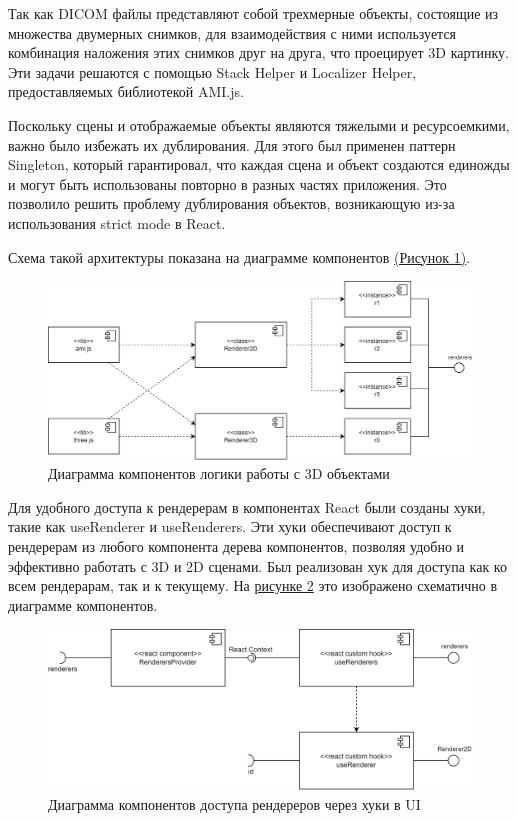 Так как DICOM файлы представляют собой трехмерные объекты, состоящие из множества двумерных снимков, для взаимодействия с ними используется комбинация наложения этих снимков друг на друга, что проецирует 3D картинку. Эти задачи решаются с помощью Stack Helper и Localizer Helper, предоставляемых библиотекой AMI.js.

Поскольку сцены и отображаемые объекты являются тяжелыми и ресурсоемкими, важно было избежать их дублирования. Для этого был применен паттерн Singleton, который гарантировал, что каждая сцена и объект создаются единожды и могут быть использованы повторно в разных частях приложения. Это позволило решить проблему дублирования объектов, возникающую из-за использования strict mode в React.

Схема такой архитектуры показана на диаграмме компонентов \hyperref[fig:bird1]{(Рисунок \ref*{fig:db_scheme})}.

    \begin{figure}[ht]
        \centering
        \includegraphics[]{images/chap3/renderers_uml_components.drawio.png}
        \caption{Диаграмма компонентов логики работы с 3D объектами}
        \label{fig:db_scheme}
    \end{figure}

Для удобного доступа к рендерерам в компонентах React были созданы хуки, такие как useRenderer и useRenderers. Эти хуки обеспечивают доступ к рендерерам из любого компонента дерева компонентов, позволяя удобно и эффективно работать с 3D и 2D сценами. Был реализован хук для доступа как ко всем рендерарам, так и к текущему. На \hyperref[fig:hooks]{рисунке \ref*{fig:hooks}} это изображено схематично в диаграмме компонентов.

    \begin{figure}[H]
        \centering
        \includegraphics[]{images/chap3/react_uml_components.drawio.png}
        \caption{Диаграмма компонентов доступа рендереров через хуки в UI}
        \label{fig:hooks}
    \end{figure}

